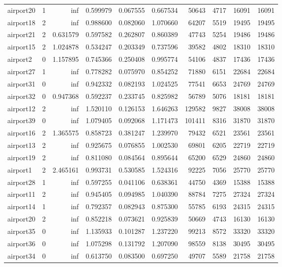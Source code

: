 \begin{longtable}{|l|r|r|r|r|r|r|r|r|r|}
airport20 & 1 & inf & 0.599979 & 0.067555 & 0.667534 & 50643 & 4717 & 16091 & 16091 \\
airport18 & 2 & inf & 0.988600 & 0.082060 & 1.070660 & 64207 & 5519 & 19495 & 19495 \\
airport21 & 2 & 0.631579 & 0.597582 & 0.262807 & 0.860389 & 47743 & 5254 & 19486 & 19486 \\
airport15 & 2 & 1.024878 & 0.534247 & 0.203349 & 0.737596 & 39582 & 4802 & 18310 & 18310 \\
airport2 & 0 & 1.157895 & 0.745366 & 0.250408 & 0.995774 & 54106 & 4837 & 17436 & 17436 \\
airport27 & 1 & inf & 0.778282 & 0.075970 & 0.854252 & 71880 & 6151 & 22684 & 22684 \\
airport31 & 0 & inf & 0.942332 & 0.082193 & 1.024525 & 77541 & 6653 & 24769 & 24769 \\
airport32 & 0 & 0.947368 & 0.592237 & 0.233745 & 0.825982 & 56789 & 5076 & 18181 & 18181 \\
airport12 & 2 & inf & 1.520110 & 0.126153 & 1.646263 & 129582 & 9827 & 38008 & 38008 \\
airport39 & 0 & inf & 1.079405 & 0.092068 & 1.171473 & 101411 & 8316 & 31870 & 31870 \\
airport16 & 2 & 1.365575 & 0.858723 & 0.381247 & 1.239970 & 79432 & 6521 & 23561 & 23561 \\
airport13 & 2 & inf & 0.925675 & 0.076855 & 1.002530 & 69801 & 6205 & 22719 & 22719 \\
airport19 & 2 & inf & 0.811080 & 0.084564 & 0.895644 & 65200 & 6529 & 24860 & 24860 \\
airport1 & 2 & 2.465161 & 0.993731 & 0.530585 & 1.524316 & 92225 & 7056 & 25770 & 25770 \\
airport28 & 1 & inf & 0.597255 & 0.041106 & 0.638361 & 44750 & 4369 & 15388 & 15388 \\
airport11 & 2 & inf & 0.945405 & 0.094985 & 1.040390 & 88784 & 7275 & 27324 & 27324 \\
airport14 & 1 & inf & 0.792357 & 0.082943 & 0.875300 & 55785 & 6193 & 24315 & 24315 \\
airport20 & 2 & inf & 0.852218 & 0.073621 & 0.925839 & 50669 & 4743 & 16130 & 16130 \\
airport35 & 0 & inf & 1.135933 & 0.101287 & 1.237220 & 99213 & 8572 & 33320 & 33320 \\
airport36 & 0 & inf & 1.075298 & 0.131792 & 1.207090 & 98559 & 8138 & 30495 & 30495 \\
airport34 & 0 & inf & 0.613750 & 0.083500 & 0.697250 & 49707 & 5589 & 21758 & 21758 \\

\end{longtable}
